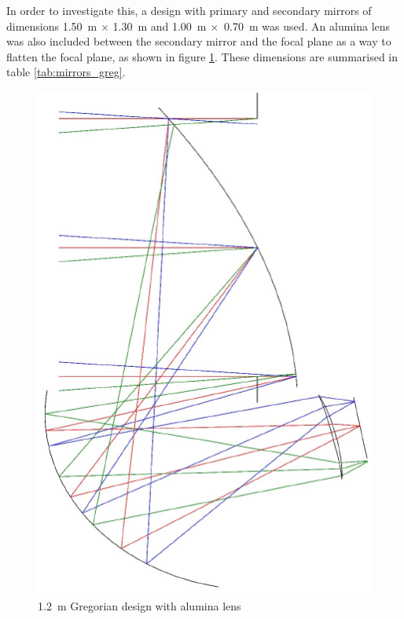 \documentclass[11pt,a4paper]{article}
\begin{document}
In order to investigate this, a design with primary and secondary mirrors of dimensions 1.50~m $\times$ 1.30~m and 1.00~m $\times$~0.70~m was used. An alumina lens was also included between the secondary mirror and the focal plane as a way to flatten the focal plane, as shown in figure \ref{fig:gregschem_lens}. These dimensions are summarised in table \ref{tab:mirrors_greg}.
\begin{figure}[htbp]
	\centering
	\includegraphics[scale=0.5]{core_greg_lens.png}
	\caption{1.2~m Gregorian design with alumina lens}
	\label{fig:gregschem_lens}
\end{figure}
\end{document}
